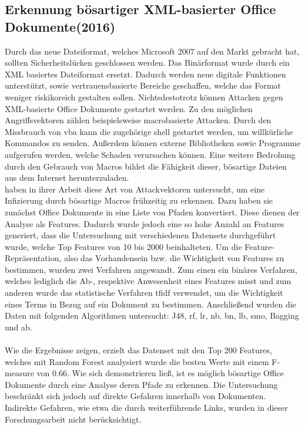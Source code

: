 \documentclass[
    12pt, %
    DIV10,
    ngerman, %
    a4paper, %
    oneside, %
    titlepage, %
    parskip=half, %
    headings=normal, %
    listof=totoc, %
    bibliography=totoc, %
    index=totoc, %
    captions=tableheading, %
    final %
]{scrreprt}
\begin{document}
\subsection{Erkennung bösartiger XML-basierter Office Dokumente(2016)}
Durch das neue Dateiformat, welches Microsoft 2007 auf den Markt gebracht hat, sollten Sicherheitslücken geschlossen werden.
Das Binärformat wurde durch ein	XML basiertes Dateiformat ersetzt. Dadurch werden neue digitale Funktionen unterstützt, sowie vertrauensbasierte Bereiche geschaffen, welche das Format weniger riskikoreich gestalten sollen. Nichtsdestotrotz können Attacken gegen XML-basierte Office Dokumente gestartet werden. Zu den möglichen Angriffsvektoren zählen beispielsweise macrobasierte Attacken. Durch den Missbrauch von \ac{vba} kann die zugehörige shell gestartet werden, um willkürliche Kommandos zu senden. Außerdem können externe Bibliotheken sowie Programme aufgerufen werden, welche Schaden verursachen können. Eine weitere Bedrohung durch den Gebrauch von Macros bildet die Fähigkeit dieser, bösartige Dateien aus dem Internet herunterzuladen.\\
\textcite{Cohen2016} haben in ihrer Arbeit diese Art von Attackvektoren untersucht, um eine Infizierung durch bösartige Macros frühzeitig zu erkennen. Dazu haben sie zunächst Office Dokumente in eine Liste von Pfaden konvertiert. Diese dienen der Analyse als Features. Dadurch wurde jedoch eine so hohe Anzahl an Features generiert, dass die Untersuchung mit verschiedenen Datensets durchgeführt wurde, welche Top Features von 10 bis 2000 beinhalteten. Um die Feature-Repräsentation, also das Vorhandensein bzw. die Wichtigkeit von Features zu bestimmen, wurden zwei Verfahren angewandt. Zum einen ein binäres Verfahren, welches lediglich die Ab-, respektive Anwesenheit eines Features misst und zum anderen wurde das statistische Verfahren \ac{tfidf} verwendet, um die Wichtigkeit eines Terms in Bezug auf ein Dokument zu bestimmen. Anschließend wurden die Daten mit folgenden Algorithmen untersucht: J48, \ac{rf}, \ac{lr}, \ac{nb}, \ac{bn}, \ac{lb}, \ac{smo}, Bagging und \ac{ab}. \\\\
Wie die Ergebnisse zeigen, erzielt das Datenset mit den Top 200 Features, welches mit Random Forest analysiert wurde die besten Werte mit einem F-measure von 0.66.
Wie sich demonstrieren ließ, ist es möglich bösartige Office Dokumente durch eine Analyse deren Pfade zu erkennen. 
Die Untersuchung beschränkt sich jedoch auf direkte Gefahren innerhalb von Dokumenten. Indirekte Gefahren, wie etwa die durch weiterführende Links, wurden in dieser Forschungsarbeit nicht berücksichtigt.
\end{document}
